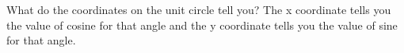 {What do the coordinates on the unit circle tell you?}
{The x coordinate tells you the value of cosine for that angle and the y coordinate tells you the value of sine for that angle.}
